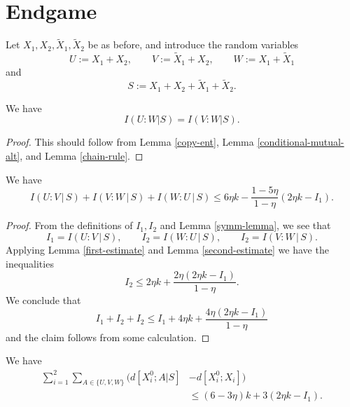 \section{Endgame}

Let $X_1,X_2,\tilde X_1,\tilde X_2$ be as before, and introduce the random variables
\[U := X_1 + X_2, \qquad V := \tilde X_1 + X_2, \qquad W := X_1 + \tilde X_1\] and
\[  S := X_1 + X_2 + \tilde X_1 + \tilde X_2.\]

\begin{lemma}\label{symm-lemma}
  \leanok
We have
$$ I(U:W | S) = I(V:W | S).$$
\end{lemma}

\begin{proof}\leanok
This should follow from Lemma \ref{copy-ent}, Lemma \ref{conditional-mutual-alt}, and Lemma \ref{chain-rule}.
\end{proof}

\begin{lemma}\label{uvw-s}
\leanok
We have
$$
I(U : V \, | \, S) + I(V : W \, | \,S) + I(W : U \, | \, S) \leq 6 \eta k - \frac{1 - 5 \eta}{1-\eta} (2 \eta k - I_1).
$$
\end{lemma}

\begin{proof}
  \leanok
From the definitions of $I_1,I_2$ and Lemma \ref{symm-lemma}, we see that
\[
  I_1 = I(U : V \, | \, S), \qquad I_2 = I(W : U \, | \, S), \qquad I_2 = I(V : W \, | \,S).
\]
Applying Lemma \ref{first-estimate} and Lemma \ref{second-estimate} we have the inequalities
\[  I_2 \leq 2 \eta k + \frac{2\eta(2 \eta k - I_1)}{1-\eta} .
\]
We conclude that
$$
   I_1 + I_2 + I_2 \leq I_1+4\eta k+ \frac{4\eta(2 \eta k - I_1)}{1-\eta}
$$
and the claim follows from some calculation.
\end{proof}

\begin{lemma}\label{total-dist}\leanok
   We have
\begin{align*}
  \sum_{i=1}^2 \sum_{A\in\{U,V,W\}} \big(d[X^0_i;A|S] & - d[X^0_i;X_i]\big) \\
    &\leq (6 - 3\eta) k + 3(2 \eta k - I_1).
\end{align*}
\end{lemma}

